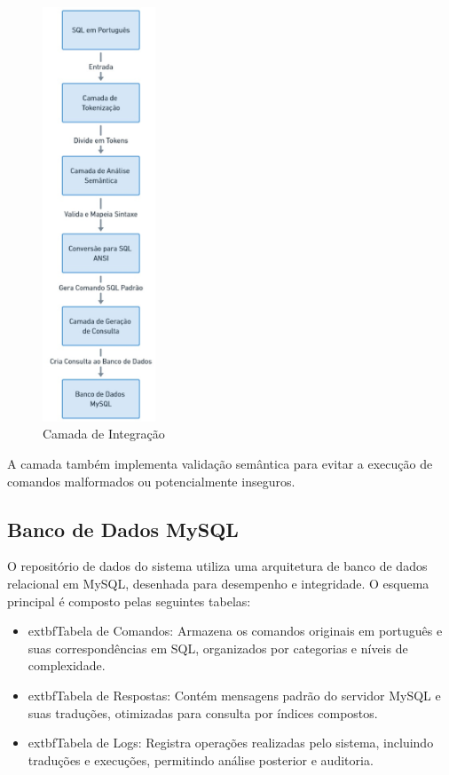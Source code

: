 \begin{figure}[H]
    \centering
    \includegraphics[width=0.3\textwidth]{figuras/FluxoConceitualTraducao.eps}
    \caption{Camada de Integração}
    \label{fig:Camada de traducao}
\end{figure}

A camada também implementa validação semântica para evitar a execução de comandos malformados ou potencialmente inseguros.

\subsection{Banco de Dados MySQL}
O repositório de dados do sistema utiliza uma arquitetura de banco de dados relacional em MySQL, desenhada para desempenho e integridade. O esquema principal é composto pelas seguintes tabelas:

\begin{itemize}
    \item 	extbf{Tabela de Comandos}: Armazena os comandos originais em português e suas correspondências em SQL, organizados por categorias e níveis de complexidade.
    \item 	extbf{Tabela de Respostas}: Contém mensagens padrão do servidor MySQL e suas traduções, otimizadas para consulta por índices compostos.
    \item 	extbf{Tabela de Logs}: Registra operações realizadas pelo sistema, incluindo traduções e execuções, permitindo análise posterior e auditoria.
\end{itemize}

